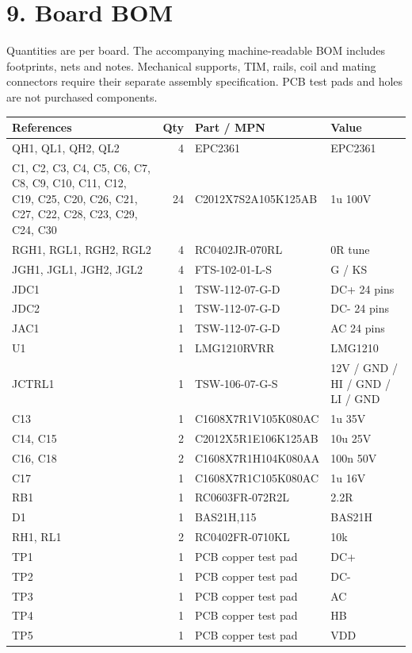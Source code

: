 \documentclass[10pt,a4paper]{article}
\begin{document}
\section*{9. Board BOM}
Quantities are per board. The accompanying machine-readable BOM includes footprints, nets and notes. Mechanical supports, TIM, rails, coil and mating connectors require their separate assembly specification. PCB test pads and holes are not purchased components.
\small
\begin{longtable}{p{.30\linewidth}r p{.31\linewidth}p{.23\linewidth}}\hline
References & Qty & Part / MPN & Value\\\hline\endhead
QH1, QL1, QH2, QL2 & 4 & EPC2361 & EPC2361 \\ \hline
C1, C2, C3, C4, C5, C6, C7, C8, C9, C10, C11, C12, C19, C25, C20, C26, C21, C27, C22, C28, C23, C29, C24, C30 & 24 & C2012X7S2A105K125AB & 1u 100V \\ \hline
RGH1, RGL1, RGH2, RGL2 & 4 & RC0402JR-070RL & 0R tune \\ \hline
JGH1, JGL1, JGH2, JGL2 & 4 & FTS-102-01-L-S & G / KS \\ \hline
JDC1 & 1 & TSW-112-07-G-D & DC+ 24 pins \\ \hline
JDC2 & 1 & TSW-112-07-G-D & DC- 24 pins \\ \hline
JAC1 & 1 & TSW-112-07-G-D & AC 24 pins \\ \hline
U1 & 1 & LMG1210RVRR & LMG1210 \\ \hline
JCTRL1 & 1 & TSW-106-07-G-S & 12V / GND / HI / GND / LI / GND \\ \hline
C13 & 1 & C1608X7R1V105K080AC & 1u 35V \\ \hline
C14, C15 & 2 & C2012X5R1E106K125AB & 10u 25V \\ \hline
C16, C18 & 2 & C1608X7R1H104K080AA & 100n 50V \\ \hline
C17 & 1 & C1608X7R1C105K080AC & 1u 16V \\ \hline
RB1 & 1 & RC0603FR-072R2L & 2.2R \\ \hline
D1 & 1 & BAS21H,115 & BAS21H \\ \hline
RH1, RL1 & 2 & RC0402FR-0710KL & 10k \\ \hline
TP1 & 1 & PCB copper test pad & DC+ \\ \hline
TP2 & 1 & PCB copper test pad & DC- \\ \hline
TP3 & 1 & PCB copper test pad & AC \\ \hline
TP4 & 1 & PCB copper test pad & HB \\ \hline
TP5 & 1 & PCB copper test pad & VDD \\ \hline

\end{longtable}
\end{document}
